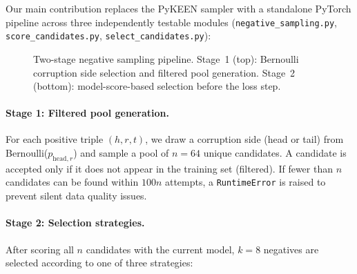\documentclass[10pt,twocolumn,letterpaper]{article}
\begin{document}
Our main contribution replaces the PyKEEN sampler with a standalone PyTorch
pipeline across three independently testable modules
(\texttt{negative\_sampling.py}, \texttt{score\_candidates.py},
\texttt{select\_candidates.py}):

\begin{figure}[h]
\centering
{}
\caption{Two-stage negative sampling pipeline. Stage~1 (top): Bernoulli
corruption side selection and filtered pool generation. Stage~2 (bottom):
model-score-based selection before the loss step.}
\label{fig:pipeline}
\end{figure}

\paragraph{Stage 1: Filtered pool generation.}
For each positive triple $(h,r,t)$, we draw a corruption side (head or tail)
from Bernoulli($p_{\mathrm{head},r}$) and sample a pool of $n=64$ unique
candidates. A candidate is accepted only if it does not appear in the training
set (filtered). If fewer than $n$ candidates can be found within
$100n$ attempts, a \texttt{RuntimeError} is raised to prevent silent
data quality issues.

\paragraph{Stage 2: Selection strategies.}
After scoring all $n$ candidates with the current model, $k=8$ negatives are
selected according to one of three strategies:
\end{document}
